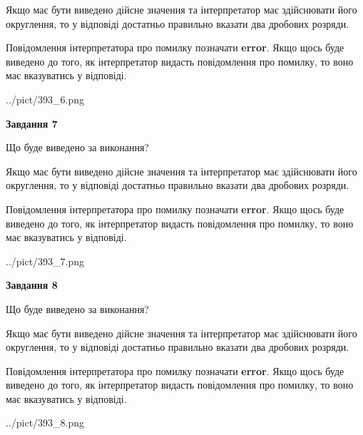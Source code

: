 \documentclass[12pt, ukrainian]{article}
\begin{document}
{\begin {Large}
Якщо має бути виведено дійсне значення та інтерпретатор має здійснювати його округлення, 
то у відповіді достатньо правильно вказати два дробових розряди.

Повідомлення інтерпретатора про помилку позначати \textbf{error}.
Якщо щось буде виведено до того, як інтерпретатор видасть повідомлення про помилку, 
то воно має вказуватись у відповіді. \par

\begin{center}
	{../pict/393_6.png}
\end{center}
\newpage

{\begin {center}\textbf{Завдання 7}\end {center}}\par
Що буде виведено за виконання? \par

Якщо має бути виведено дійсне значення та інтерпретатор має здійснювати його округлення, 
то у відповіді достатньо правильно вказати два дробових розряди.

Повідомлення інтерпретатора про помилку позначати \textbf{error}.
Якщо щось буде виведено до того, як інтерпретатор видасть повідомлення про помилку, 
то воно має вказуватись у відповіді. \par

\begin{center}
	{../pict/393_7.png}
\end{center}
\newpage

{\begin {center}\textbf{Завдання 8}\end {center}}\par
Що буде виведено за виконання? \par

Якщо має бути виведено дійсне значення та інтерпретатор має здійснювати його округлення, 
то у відповіді достатньо правильно вказати два дробових розряди.

Повідомлення інтерпретатора про помилку позначати \textbf{error}.
Якщо щось буде виведено до того, як інтерпретатор видасть повідомлення про помилку, 
то воно має вказуватись у відповіді. \par

\begin{center}
	{../pict/393_8.png}
\end{center}
\newpage


\end{Large}}
\end{document}
